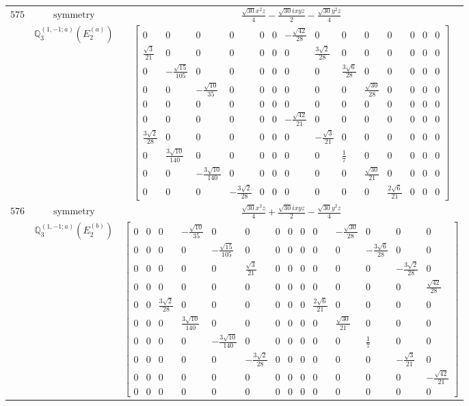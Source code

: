 \documentclass[fleqn,8pt,landscape]{jsarticle}
\begin{document}
\begin{longtable}{ccc}
$ 575 $ & $ \text{symmetry} $ & $ \frac{\sqrt{30} x^{2} z}{4} - \frac{\sqrt{30} i x y z}{2} - \frac{\sqrt{30} y^{2} z}{4} $ \\
$  $ & $ \mathbb{Q}_{3}^{(1,-1;a)}(E_{2}^{(a)}) $ & $ \begin{bmatrix} 0 & 0 & 0 & 0 & 0 & 0 & - \frac{\sqrt{42}}{28} & 0 & 0 & 0 & 0 & 0 & 0 & 0 \\ \frac{\sqrt{3}}{21} & 0 & 0 & 0 & 0 & 0 & 0 & \frac{3 \sqrt{2}}{28} & 0 & 0 & 0 & 0 & 0 & 0 \\ 0 & - \frac{\sqrt{15}}{105} & 0 & 0 & 0 & 0 & 0 & 0 & \frac{3 \sqrt{6}}{28} & 0 & 0 & 0 & 0 & 0 \\ 0 & 0 & - \frac{\sqrt{10}}{35} & 0 & 0 & 0 & 0 & 0 & 0 & \frac{\sqrt{30}}{28} & 0 & 0 & 0 & 0 \\ 0 & 0 & 0 & 0 & 0 & 0 & 0 & 0 & 0 & 0 & 0 & 0 & 0 & 0 \\ 0 & 0 & 0 & 0 & 0 & 0 & - \frac{\sqrt{42}}{21} & 0 & 0 & 0 & 0 & 0 & 0 & 0 \\ \frac{3 \sqrt{2}}{28} & 0 & 0 & 0 & 0 & 0 & 0 & - \frac{\sqrt{3}}{21} & 0 & 0 & 0 & 0 & 0 & 0 \\ 0 & \frac{3 \sqrt{10}}{140} & 0 & 0 & 0 & 0 & 0 & 0 & \frac{1}{7} & 0 & 0 & 0 & 0 & 0 \\ 0 & 0 & - \frac{3 \sqrt{10}}{140} & 0 & 0 & 0 & 0 & 0 & 0 & \frac{\sqrt{30}}{21} & 0 & 0 & 0 & 0 \\ 0 & 0 & 0 & - \frac{3 \sqrt{2}}{28} & 0 & 0 & 0 & 0 & 0 & 0 & \frac{2 \sqrt{6}}{21} & 0 & 0 & 0 \end{bmatrix} $ \\ \hline
$ 576 $ & $ \text{symmetry} $ & $ \frac{\sqrt{30} x^{2} z}{4} + \frac{\sqrt{30} i x y z}{2} - \frac{\sqrt{30} y^{2} z}{4} $ \\
$  $ & $ \mathbb{Q}_{3}^{(1,-1;a)}(E_{2}^{(b)}) $ & $ \begin{bmatrix} 0 & 0 & 0 & - \frac{\sqrt{10}}{35} & 0 & 0 & 0 & 0 & 0 & 0 & - \frac{\sqrt{30}}{28} & 0 & 0 & 0 \\ 0 & 0 & 0 & 0 & - \frac{\sqrt{15}}{105} & 0 & 0 & 0 & 0 & 0 & 0 & - \frac{3 \sqrt{6}}{28} & 0 & 0 \\ 0 & 0 & 0 & 0 & 0 & \frac{\sqrt{3}}{21} & 0 & 0 & 0 & 0 & 0 & 0 & - \frac{3 \sqrt{2}}{28} & 0 \\ 0 & 0 & 0 & 0 & 0 & 0 & 0 & 0 & 0 & 0 & 0 & 0 & 0 & \frac{\sqrt{42}}{28} \\ 0 & 0 & \frac{3 \sqrt{2}}{28} & 0 & 0 & 0 & 0 & 0 & 0 & \frac{2 \sqrt{6}}{21} & 0 & 0 & 0 & 0 \\ 0 & 0 & 0 & \frac{3 \sqrt{10}}{140} & 0 & 0 & 0 & 0 & 0 & 0 & \frac{\sqrt{30}}{21} & 0 & 0 & 0 \\ 0 & 0 & 0 & 0 & - \frac{3 \sqrt{10}}{140} & 0 & 0 & 0 & 0 & 0 & 0 & \frac{1}{7} & 0 & 0 \\ 0 & 0 & 0 & 0 & 0 & - \frac{3 \sqrt{2}}{28} & 0 & 0 & 0 & 0 & 0 & 0 & - \frac{\sqrt{3}}{21} & 0 \\ 0 & 0 & 0 & 0 & 0 & 0 & 0 & 0 & 0 & 0 & 0 & 0 & 0 & - \frac{\sqrt{42}}{21} \\ 0 & 0 & 0 & 0 & 0 & 0 & 0 & 0 & 0 & 0 & 0 & 0 & 0 & 0 \end{bmatrix} $ \\ \hline

\end{longtable}
\end{document}
